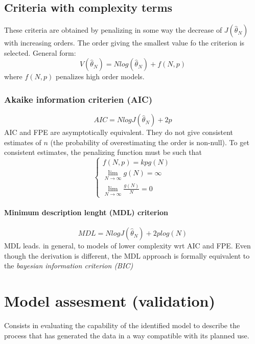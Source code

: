 \documentclass{book}
\theoremstyle{definition}
\theoremstyle{remark}
\theoremstyle{remark}
\begin{document}
\section{Criteria with complexity terms}
These criteria are obtained by penalizing in some way the decrease of $J(\hat{\theta}_N)$with increasing orders. The order giving the smallest value fo the criterion is selected.
General form:
\[
    V(\hat{\theta}_N)=Nlog(\hat{\theta}_N)+f(N,p)
\]
where $f(N,p)$ penalizes high order models.

\subsection{Akaike information criterien (AIC)}
\[
    AIC=NlogJ(\hat{\theta}_N)+2p
\]
AIC and FPE are asymptotically equivalent. They do not give consistent estimates of $n$ (the probability of overestimating the order is non-null). To get consistent estimates, the penalizing function must be such that
\[
    \begin{cases}
        f(N,p)=kpg(N)\\
        \lim_{N\to\infty}g(N)=\infty\\
        \lim_{N\to\infty}\displaystyle\frac{g(N)}{N}=0
    \end{cases}
\]
\subsubsection{Minimum description lenght (MDL) criterion}
\[
    MDL=N logJ(\hat{\theta}_N)+2plog(N)
\]
MDL leads. in general, to models of lower complexity wrt AIC and FPE. Even though the derivation is different, the MDL approach is formally equivalent to  the \emph{bayesian information criterion (BIC)}




\chapter{Model assesment (validation)}

Consists in evaluating the capability of the identified model to describe the process that has generated the data in a way compatible with its planned use. 
\end{document}
